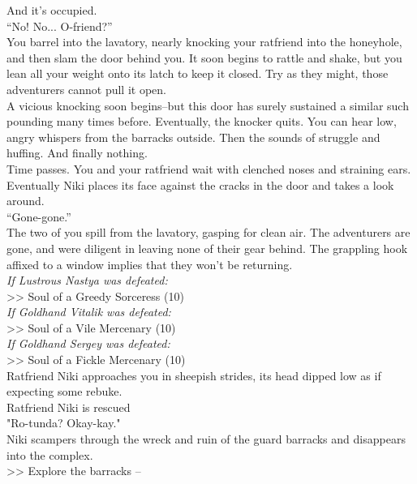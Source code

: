And it’s occupied.\\

“No! No... O-friend?”\\

You barrel into the lavatory, nearly knocking your ratfriend into the honeyhole, and then slam the door behind you. It soon begins to rattle and shake, but you lean all your weight onto its latch to keep it closed. Try as they might, those adventurers cannot pull it open.\\

A vicious knocking soon begins--but this door has surely sustained a similar such pounding many times before. Eventually, the knocker quits. You can hear low, angry whispers from the barracks outside. Then the sounds of struggle and huffing. And finally nothing.\\

Time passes. You and your ratfriend wait with clenched noses and straining ears. Eventually Niki places its face against the cracks in the door and takes a look around.\\

“Gone-gone.”\\

The two of you spill from the lavatory, gasping for clean air. The adventurers are gone, and were diligent in leaving none of their gear behind. The grappling hook affixed to a window implies that they won't be returning.\\

\emph{If Lustrous Nastya was defeated:}\\
>> Soul of a Greedy Sorceress (10)\\

\emph{If Goldhand Vitalik was defeated:}\\
>> Soul of a Vile Mercenary (10)\\

\emph{If Goldhand Sergey was defeated:}\\
>> Soul of a Fickle Mercenary (10)\\

Ratfriend Niki approaches you in sheepish strides, its head dipped low as if expecting some rebuke.\\
 Ratfriend Niki is rescued\\

"Ro-tunda? Okay-kay."\\

Niki scampers through the wreck and ruin of the guard barracks and disappears into the complex.\\

>> Explore the barracks -- 
